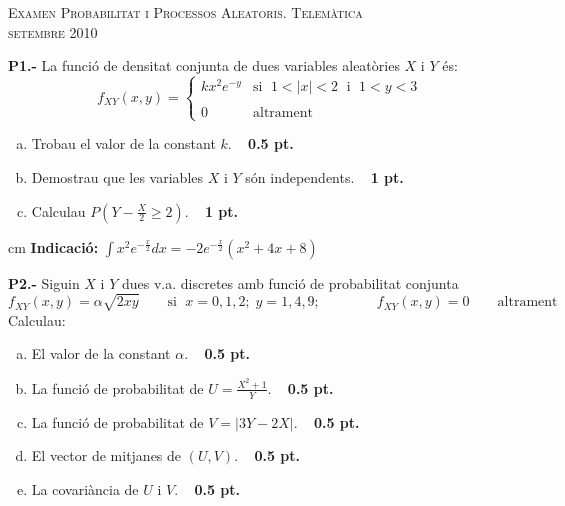 \documentclass[11pt]{report}
\begin{document}
\begin{center}
\textsc{Examen Probabilitat i Processos Aleatoris.
Telem\`{a}tica\\
setembre 2010}
\end{center}

\noindent\textbf{P1.-}
La funci\'o de densitat conjunta de dues variables aleat\`ories $X$ i $Y$ \'es:
\[
f_{XY}(x, y)=\begin{cases} k x^2 e^{-y} & \text{si } \; 1 < |x| < 2 \; \text{ i } \; 1 < y < 3 \\
\\
0 & \text{altrament}
\end{cases}
\]
\begin{enumerate}[a)]
\item Trobau el valor de la constant $k$. \ \hfill{\textbf{ 0.5 pt.}}
\item Demostrau que les variables $X$ i $Y$ s\'on independents.  \ \hfill{\textbf{ 1 pt.}}
\item Calculau $P(Y-\frac{X}{2} \geq 2)$.  \ \hfill{\textbf{ 1 pt.}}
\end{enumerate}

 cm
\textbf{Indicaci\'o:} $\int x^2 e^{-\frac{x}{2}} dx = -2 e^{-\frac{x}{2}} (x^2+4x+8)$

\vspace{0.75 cm}

\noindent\textbf{P2.-}
Siguin $X$ i $Y$ dues v.a. discretes amb funci\'o de probabilitat conjunta
\[
f_{XY}(x, y)=\alpha \sqrt{2xy}  \qquad \text{si } \; x=0, 1, 2; \; y=1, 4, 9; \qquad
\qquad f_{XY}(x, y)=0 \qquad \text{altrament}
\]
\noindent
Calculau:
\begin{enumerate}[a)]
\item El valor de la constant $\alpha$. \ \hfill{\textbf{ 0.5 pt.}}
\item La funci\'o de probabilitat de $U=\frac{X^2+1}{Y}$. \ \hfill{\textbf{ 0.5 pt.}}
\item La funci\'o de probabilitat de $V=|3Y-2X|$. \ \hfill{\textbf{ 0.5 pt.}}
\item El vector de mitjanes de $(U, V)$. \ \hfill{\textbf{ 0.5 pt.}}
\item La covari\`ancia de $U$ i $V$. \ \hfill{\textbf{ 0.5 pt.}}
\end{enumerate}

\vspace{0.75 cm}
\end{document}

